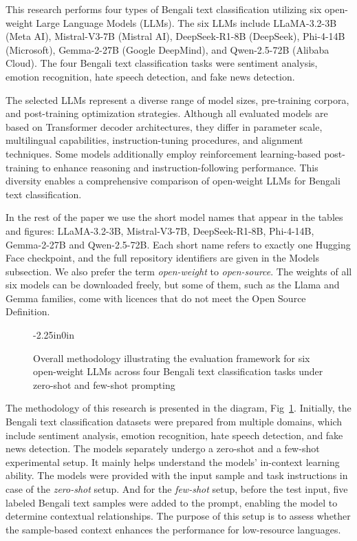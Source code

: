 \documentclass[10pt,letterpaper]{article}
\begin{document}
This research performs four types of Bengali text classification utilizing six 
open-weight Large Language Models (LLMs). The six LLMs include LLaMA-3.2-3B 
(Meta AI), Mistral-V3-7B (Mistral AI), DeepSeek-R1-8B (DeepSeek), Phi-4-14B 
(Microsoft), Gemma-2-27B (Google DeepMind), and Qwen-2.5-72B (Alibaba Cloud). 
The four Bengali text classification tasks were sentiment analysis, emotion 
recognition, hate speech detection, and fake news detection.

The selected LLMs represent a diverse range of model sizes, pre-training 
corpora, and post-training optimization strategies. Although all evaluated 
models are based on Transformer decoder architectures, they differ in parameter 
scale, multilingual capabilities, instruction-tuning procedures, and alignment 
techniques. Some models additionally employ reinforcement learning-based 
post-training to enhance reasoning and instruction-following performance. This 
diversity enables a comprehensive comparison of open-weight LLMs for Bengali 
text classification.

In the rest of the paper we use the short model names that appear in the tables and figures: LLaMA-3.2-3B, Mistral-V3-7B, DeepSeek-R1-8B, Phi-4-14B, Gemma-2-27B and Qwen-2.5-72B. Each short name refers to exactly one Hugging Face checkpoint, and the full repository identifiers are given in the Models subsection. We also prefer the term \emph{open-weight} to \emph{open-source}. The weights of all six models can be downloaded freely, but some of them, such as the Llama and Gemma families, come with licences that do not meet the Open Source Definition.


\begin{figure}[t]
\begin{adjustwidth}{-2.25in}{0in}
    \centering
    \caption{Overall methodology illustrating the evaluation framework for six open-weight LLMs across four Bengali text classification tasks under zero-shot and few-shot prompting}
    \label{fig:prompt-methodology}
\end{adjustwidth}
\end{figure}

The methodology of this research is presented in the diagram, Fig~\ref{fig:prompt-methodology}. Initially, the Bengali text classification datasets were prepared from multiple domains, which include sentiment analysis, emotion recognition, hate speech detection, and fake news detection. The models separately undergo a zero-shot and a few-shot experimental setup. It mainly helps understand the models' in-context learning ability. The models were provided with the input sample and task instructions in case of the \textit{zero-shot} setup. And for the \textit{few-shot} setup, before the test input, five labeled Bengali text samples were added to the prompt, enabling the model to determine contextual relationships. The purpose of this setup is to assess whether the sample-based context enhances the performance for low-resource languages.
\end{document}

